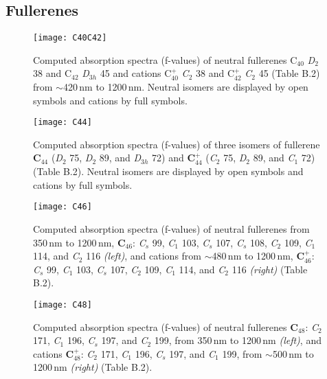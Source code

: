 \documentclass{aa}
\begin{document}
\subsection{Fullerenes}
\begin{figure}[htbp]
         \begin{center}
\texttt{[image: C40C42]}
 \caption{Computed absorption spectra (f-values) of neutral  fullerenes C$_{40}$ {\it D$_2$} 38 and C$_{42}$ {\it D$_{3h}$} 45 and cations C$_{40}^+$ {\it C$_2$} 38  and  C$_{42}^+$ {\it C$_{2}$} 45 (Table B.2) from $\sim$420\,nm to 1200\,nm.  Neutral isomers are displayed by open symbols and cations by full symbols.}
    \end{center}
 \end{figure}

\begin{figure}[htbp]
         \begin{center}
\texttt{[image: C44]}
 \caption{Computed absorption spectra (f-values) of three isomers of fullerene {\bf C$_{44}$} ({\it D$_2$} 75, {\it D$_2$} 89, and {\it D$_{3h}$} 72) and {\bf C$_{44}^+$} ({\it C$_2$} 75, {\it D$_2$} 89, and {\it C$_1$} 72) 
(Table B.2). Neutral isomers are displayed by open symbols and cations by 
full symbols.}
     \end{center}
 \end{figure}

\begin{figure*}[htbp]
         \begin{center}
\texttt{[image: C46]}
 \caption{Computed absorption spectra (f-values) of neutral  fullerenes from 350\,nm to 1200\,nm, {\bf C$_{46}$}: {\it C$_s$} 99, {\it C$_1$} 103, 
{\it C$_s$} 107, {\it C$_s$} 108, {\it C$_2$} 109, {\it C$_1$} 114, and   {\it C$_2$} 116 {\it (left)}, and cations from $\sim$480\,nm to 1200\,nm, {\bf C$_{46}^+$}: {\it C$_s$} 99, {\it C$_1$} 103, {\it C$_s$} 107, {\it C$_2$} 109, {\it C$_1$} 114, and   {\it C$_2$} 116  {\it (right)} (Table B.2).}
     \end{center}
 \end{figure*}

\begin{figure*}[htbp]
         \begin{center}
\texttt{[image: C48]}
 \caption{Computed absorption spectra (f-values)  of neutral fullerenes {\bf C$_{48}$}: {\it C$_2$} 171, {\it C$_1$} 196, {\it C$_s$} 197, and  {\it C$_2$} 199, from 350\,nm to 1200\,nm  {\it (left)}, and cations {\bf C$_{48}^+$}: {\it C$_2$} 171, {\it C$_1$} 196, {\it C$_s$} 197, and  {\it C$_1$} 
199, from $\sim$500\,nm to 1200\,nm {\it (right)} (Table B.2).}
     \end{center}
 \end{figure*}
\end{document}

